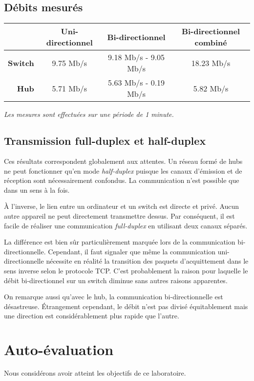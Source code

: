 \documentclass[11pt,a4paper]{article}
\begin{document}
\subsection{Débits mesurés}

\begin{tabular}{|r|c||c|c|}
	\hline
	& \textbf{Uni-directionnel} & \textbf{Bi-directionnel}  & \textbf{Bi-directionnel combiné}\\
	\hline
	\textbf{Switch} & 9.75 Mb/s & 9.18 Mb/s - 9.05 Mb/s & 18.23 Mb/s \\
	\textbf{Hub} & 5.71 Mb/s & 5.63 Mb/s - 0.19  Mb/s & 5.82 Mb/s \\
	\hline
\end{tabular}

\textit{Les mesures sont effectuées sur une période de 1 minute.}

\subsection{Transmission full-duplex et half-duplex}

Ces résultats correspondent globalement aux attentes. Un réseau formé de hubs ne peut fonctionner qu'en mode \textit{half-duplex} puisque les canaux d'émission et de réception sont nécessairement confondus. La communication n'est possible que dans un sens à la fois.

À l'inverse, le lien entre un ordinateur et un switch est directe et privé. Aucun autre appareil ne peut directement transmettre dessus. Par conséquent, il est facile de réaliser une communication \textit{full-duplex} en utilisant deux canaux séparés.

La différence est bien sûr particulièrement marquée lors de la communication bi-directionnelle. Cependant, il faut signaler que même la communication uni-directionnelle nécessite en réalité la transition des paquets d'acquittement dans le sens inverse selon le protocole TCP. C'est probablement la raison pour laquelle le débit bi-directionnel sur un switch diminue sans autres raisons apparentes.

On remarque aussi qu'avec le hub, la communication bi-directionnelle est désastreuse. Étrangement cependant, le débit n'est pas divisé équitablement mais une direction est considérablement plus rapide que l'autre.

\section*{Auto-évaluation}

Nous considérons avoir atteint les objectifs de ce laboratoire.
\end{document}
